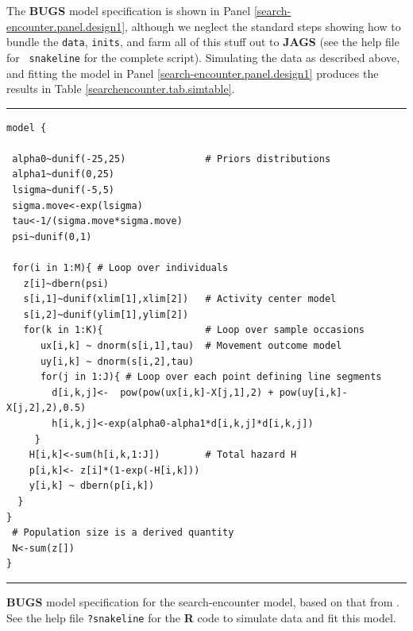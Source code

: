 The {\bf BUGS} model specification is shown in Panel
\ref{search-encounter.panel.design1}, although we neglect the standard
steps showing how to
bundle the \mbox{\tt data}, \mbox{\tt inits}, and farm
all of this stuff out to {\bf JAGS} (see the help file for \mbox{\tt
  snakeline} for the complete script).
Simulating the data as described above, and fitting the model in Panel
\ref{search-encounter.panel.design1} produces the results in Table
\ref{searchencounter.tab.simtable}.

\begin{panel}[htp]
\centering
\rule[0.15in]{\textwidth}{.03in}
{\small
\begin{verbatim}
model {

 alpha0~dunif(-25,25)              # Priors distributions
 alpha1~dunif(0,25)
 lsigma~dunif(-5,5)
 sigma.move<-exp(lsigma)
 tau<-1/(sigma.move*sigma.move)
 psi~dunif(0,1)

 for(i in 1:M){ # Loop over individuals
   z[i]~dbern(psi)
   s[i,1]~dunif(xlim[1],xlim[2])   # Activity center model
   s[i,2]~dunif(ylim[1],ylim[2])
   for(k in 1:K){                  # Loop over sample occasions
      ux[i,k] ~ dnorm(s[i,1],tau)  # Movement outcome model
      uy[i,k] ~ dnorm(s[i,2],tau)
      for(j in 1:J){ # Loop over each point defining line segments
        d[i,k,j]<-  pow(pow(ux[i,k]-X[j,1],2) + pow(uy[i,k]-X[j,2],2),0.5)
        h[i,k,j]<-exp(alpha0-alpha1*d[i,k,j]*d[i,k,j])
     }
    H[i,k]<-sum(h[i,k,1:J])        # Total hazard H
    p[i,k]<- z[i]*(1-exp(-H[i,k]))
    y[i,k] ~ dbern(p[i,k])
  }
}
 # Population size is a derived quantity
 N<-sum(z[])
}
\end{verbatim}
}
\rule[-0.15in]{\textwidth}{.03in}
\caption{
{\bf BUGS} model specification for the search-encounter model, based
on that from \citet{royle_etal:2011mee}.
See the
help file \mbox{\tt ?snakeline} for the {\bf R} code to simulate data
and fit this model.
}
\label{search-encounter.panel.design1}
\end{panel}



